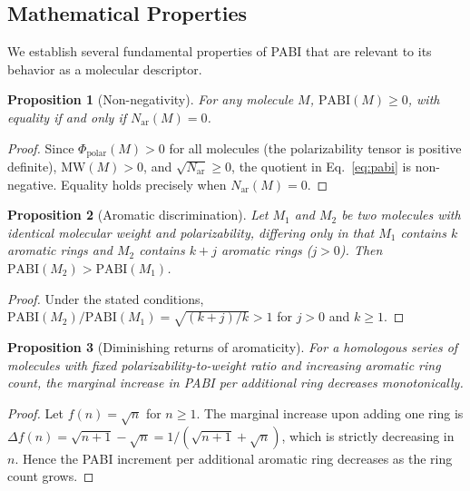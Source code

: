 \documentclass[12pt,a4paper]{article}
\newtheorem{proposition}{Proposition}
\begin{document}
\subsection{Mathematical Properties}

We establish several fundamental properties of PABI that are relevant to its behavior as a molecular descriptor.

\begin{proposition}[Non-negativity]
\label{prop:nonneg}
For any molecule $M$, $\text{PABI}(M) \geq 0$, with equality if and only if $N_{\text{ar}}(M) = 0$.
\end{proposition}

\begin{proof}
Since $\Phi_{\text{polar}}(M) > 0$ for all molecules (the polarizability tensor is positive definite), $\text{MW}(M) > 0$, and $\sqrt{N_{\text{ar}}} \geq 0$, the quotient in Eq.~\eqref{eq:pabi} is non-negative. Equality holds precisely when $N_{\text{ar}}(M) = 0$.
\end{proof}

\begin{proposition}[Aromatic discrimination]
\label{prop:aromatic}
Let $M_1$ and $M_2$ be two molecules with identical molecular weight and polarizability, differing only in that $M_1$ contains $k$ aromatic rings and $M_2$ contains $k + j$ aromatic rings ($j > 0$). Then $\text{PABI}(M_2) > \text{PABI}(M_1)$.
\end{proposition}

\begin{proof}
Under the stated conditions, $\text{PABI}(M_2) / \text{PABI}(M_1) = \sqrt{(k+j)/k} > 1$ for $j > 0$ and $k \geq 1$.
\end{proof}

\begin{proposition}[Diminishing returns of aromaticity]
\label{prop:diminishing}
For a homologous series of molecules with fixed polarizability-to-weight ratio and increasing aromatic ring count, the marginal increase in PABI per additional ring decreases monotonically.
\end{proposition}

\begin{proof}
Let $f(n) = \sqrt{n}$ for $n \geq 1$. The marginal increase upon adding one ring is $\Delta f(n) = \sqrt{n+1} - \sqrt{n} = 1/(\sqrt{n+1} + \sqrt{n})$, which is strictly decreasing in $n$. Hence the PABI increment per additional aromatic ring decreases as the ring count grows.
\end{proof}
\end{document}

